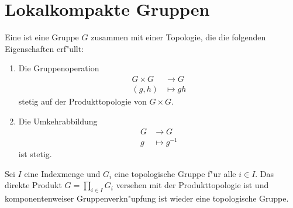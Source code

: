 \section{Lokalkompakte Gruppen}
\begin{defi}
	Eine  ist eine Gruppe $G$ zusammen mit einer Topologie, die die folgenden Eigenschaften erf"ullt:
		\begin{enumerate}[label=(\roman*), leftmargin=*, align=left, labelsep=1pt]
			\item Die Gruppenoperation
				\begin{align*}
					G \times G &\to G\\
					(g,h) &\mapsto gh
				\end{align*}
			stetig auf der Produkttopologie von $G \times G$.
			\item Die Umkehrabbildung
				\begin{align*}
					G &\to G\\
					g &\mapsto g^{-1}
				\end{align*}
				ist stetig.
		\end{enumerate}
	\end{defi}
	\begin{lemma}\label{lemma:direktesProduktTopologischerGruppen}
		Sei $I$ eine Indexmenge und $G_i$ eine topologische Gruppe f"ur alle $i \in I$. 
		Das direkte Produkt $G = \prod_{i \in I} G_i$ versehen mit der Produkttopologie ist  und komponentenweiser Gruppenverkn"upfung ist wieder eine topologische Gruppe.
	\end{lemma}
